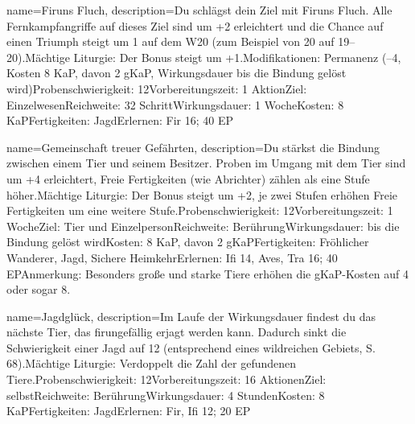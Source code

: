 {
    name={Firuns Fluch},
    description={Du schlägst dein Ziel mit Firuns Fluch. Alle Fernkampfangriffe auf dieses Ziel sind um +2 erleichtert und die Chance auf einen Triumph steigt um 1 auf dem W20 (zum Beispiel von 20 auf 19–20).\newline Mächtige Liturgie: Der Bonus steigt um +1.\newline Modifikationen: Permanenz (–4, Kosten 8 KaP, davon 2 gKaP, Wirkungsdauer bis die Bindung gelöst wird)\newline Probenschwierigkeit: 12\newline Vorbereitungszeit: 1 Aktion\newline Ziel: Einzelwesen\newline Reichweite: 32 Schritt\newline Wirkungsdauer: 1 Woche\newline Kosten: 8 KaP\newline Fertigkeiten: Jagd\newline Erlernen: Fir 16; 40 EP}
}


{
    name={Gemeinschaft treuer Gefährten},
    description={Du stärkst die Bindung zwischen einem Tier und seinem Besitzer. Proben im Umgang mit dem Tier sind um +4 erleichtert, Freie Fertigkeiten (wie Abrichter) zählen als eine Stufe höher.\newline Mächtige Liturgie: Der Bonus steigt um +2, je zwei Stufen erhöhen Freie Fertigkeiten um eine weitere Stufe.\newline Probenschwierigkeit: 12\newline Vorbereitungszeit: 1 Woche\newline Ziel: Tier und Einzelperson\newline Reichweite: Berührung\newline Wirkungsdauer: bis die Bindung gelöst wird\newline Kosten: 8 KaP, davon 2 gKaP\newline Fertigkeiten: Fröhlicher Wanderer, Jagd, Sichere Heimkehr\newline Erlernen: Ifi 14, Aves, Tra 16; 40 EP\newline Anmerkung: Besonders große und starke Tiere erhöhen die gKaP-Kosten auf 4 oder sogar 8.}
}


{
    name={Jagdglück},
    description={Im Laufe der Wirkungsdauer findest du das nächste Tier, das firungefällig erjagt werden kann. Dadurch sinkt die Schwierigkeit einer Jagd auf 12 (entsprechend eines wildreichen Gebiets, S. 68).\newline Mächtige Liturgie: Verdoppelt die Zahl der gefundenen Tiere.\newline Probenschwierigkeit: 12\newline Vorbereitungszeit: 16 Aktionen\newline Ziel: selbst\newline Reichweite: Berührung\newline Wirkungsdauer: 4 Stunden\newline Kosten: 8 KaP\newline Fertigkeiten: Jagd\newline Erlernen: Fir, Ifi 12; 20 EP}
}


